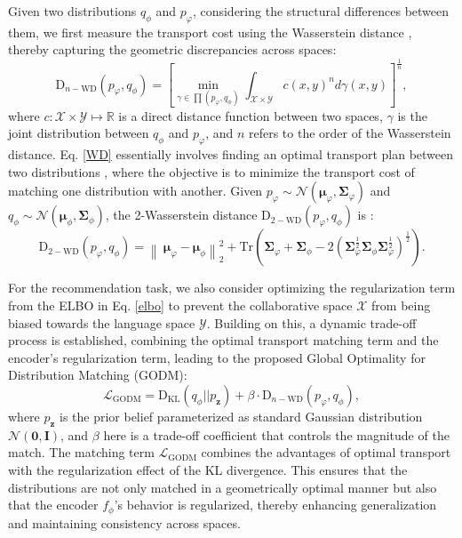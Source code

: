 \documentclass[sigconf]{acmart}
\begin{document}
Given two distributions $q_{\phi}$ and $p_{\varphi}$, considering the structural differences between them, we first measure the transport cost using the Wasserstein distance \cite{xu2020learning, liu2022exploiting}, thereby capturing the geometric discrepancies across spaces:
\begin{equation}
\label{WD}
\text{D}_{n-\text{WD}}(p_\varphi, q_\phi) = \left [\min_{\gamma \in \prod(p_\varphi, q_\phi)}\int_{\mathcal X\times \mathcal Y}c(x,y)^n d\gamma (x,y)\right ]^{\frac{1}{n}}, 
\end{equation}
where $c:\mathcal X \times \mathcal Y \mapsto \mathbb R$ is a direct distance function between two spaces, $\gamma$ is the joint distribution between $q_{\phi}$ and $p_{\varphi}$, and $n$ refers to the order of the Wasserstein distance. Eq. \ref{WD} essentially involves finding an optimal transport plan between two distributions \cite{liu2022exploiting}, where the objective is to minimize the transport cost of matching one distribution with another. Given $p_{\varphi}\sim\mathcal N(\boldsymbol{\mu}_{\varphi}, \boldsymbol{\Sigma}_{\varphi})$ and $q_{\phi}\sim\mathcal N(\boldsymbol{\mu}_{\phi}, \boldsymbol{\Sigma}_{\phi})$, the 2-Wasserstein distance $\text{D}_{2-\text{WD}}(p_\varphi, q_\phi)$ is \cite{xu2020learning}:
\begin{equation}
\text{D}_{2-\text{WD}}(p_\varphi, q_\phi) = \left \|\ \boldsymbol{\mu}_{\varphi}-\boldsymbol{\mu}_{\phi}\right \|_2^2+\text{Tr}\left (\boldsymbol{\Sigma}_{\varphi} + \boldsymbol{\Sigma}_{\phi} - 2(\boldsymbol{\Sigma}_{\varphi}^{\frac{1}{2}}\boldsymbol{\Sigma}_{\phi}\boldsymbol{\Sigma}_{\varphi}^{\frac{1}{2}})^{\frac{1}{2} } \right ).
\end{equation}

For the recommendation task, we also consider optimizing the regularization term from the ELBO in Eq. \ref{elbo} to prevent the collaborative space $\mathcal X$ from being biased towards the language space $\mathcal Y$. Building on this, a dynamic trade-off process is established, combining the optimal transport matching term and the encoder's regularization term, leading to the proposed Global Optimality for Distribution Matching (GODM):
\begin{equation}
\label{GODM}
\mathcal L_{\text{GODM}}=\text{D}_{\text{KL}}(q_\phi||p_{\mathbf z}) + \beta \cdot \text{D}_{n-\text{WD}}(p_\varphi, q_\phi), 
\end{equation}
where $p_{\mathbf z}$ is the prior belief parameterized as standard Gaussian distribution $\mathcal N(\mathbf 0, \mathbf I)$, and $\beta$ here is a trade-off coefficient that controls the magnitude of the match. The matching term  $\mathcal L_{\text{GODM}}$ combines the advantages of optimal transport with the regularization effect of the KL divergence. This ensures that the distributions are not only matched in a geometrically optimal manner but also that the encoder $f_\phi$'s behavior is regularized, thereby enhancing generalization and maintaining consistency across spaces.
\end{document}
